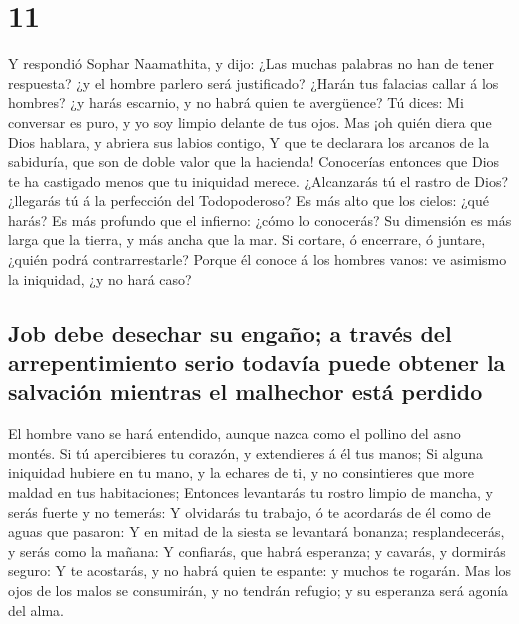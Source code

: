 \hypertarget{section-18-11}{%
\section{11}\label{section-18-11}}

 Y respondió Sophar Naamathita, y dijo: 
¿Las muchas palabras no han de tener respuesta? ¿y el hombre parlero
será justificado?  ¿Harán tus falacias callar á los
hombres? ¿y harás escarnio, y no habrá quien te avergüence?
 Tú dices: Mi conversar es puro, y yo soy limpio delante
de tus ojos.  Mas ¡oh quién diera que Dios hablara, y
abriera sus labios contigo,  Y que te declarara los
arcanos de la sabiduría, que son de doble valor que la hacienda!
Conocerías entonces que Dios te ha castigado menos que tu iniquidad
merece.  ¿Alcanzarás tú el rastro de Dios? ¿llegarás tú á
la perfección del Todopoderoso?  Es más alto que los
cielos: ¿qué harás? Es más profundo que el infierno: ¿cómo lo conocerás?
 Su dimensión es más larga que la tierra, y más ancha que
la mar.  Si cortare, ó encerrare, ó juntare, ¿quién podrá
contrarrestarle?  Porque él conoce á los hombres vanos:
ve asimismo la iniquidad, ¿y no hará caso?

\hypertarget{job-debe-desechar-su-engauxf1o-a-travuxe9s-del-arrepentimiento-serio-todavuxeda-puede-obtener-la-salvaciuxf3n-mientras-el-malhechor-estuxe1-perdido}{%
\subsection{Job debe desechar su engaño; a través del arrepentimiento
serio todavía puede obtener la salvación mientras el malhechor está
perdido}\label{job-debe-desechar-su-engauxf1o-a-travuxe9s-del-arrepentimiento-serio-todavuxeda-puede-obtener-la-salvaciuxf3n-mientras-el-malhechor-estuxe1-perdido}}

 El hombre vano se hará entendido, aunque nazca como el
pollino del asno montés.  Si tú apercibieres tu corazón,
y extendieres á él tus manos;  Si alguna iniquidad
hubiere en tu mano, y la echares de ti, y no consintieres que more
maldad en tus habitaciones;  Entonces levantarás tu
rostro limpio de mancha, y serás fuerte y no temerás:  Y
olvidarás tu trabajo, ó te acordarás de él como de aguas que pasaron:
 Y en mitad de la siesta se levantará bonanza;
resplandecerás, y serás como la mañana:  Y confiarás, que
habrá esperanza; y cavarás, y dormirás seguro:  Y te
acostarás, y no habrá quien te espante: y muchos te rogarán.
 Mas los ojos de los malos se consumirán, y no tendrán
refugio; y su esperanza será agonía del alma.

